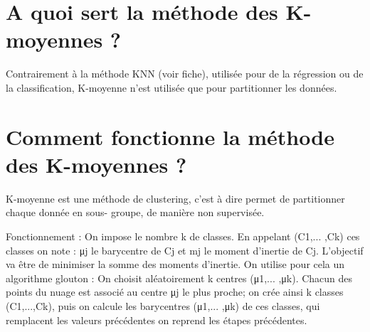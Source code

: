 \documentclass[a0,portrait]{a0poster}
\begin{document}




\color{SaddleBrown} %

\section*{A quoi sert la méthode des K-moyennes ?}

Contrairement à la méthode KNN (voir fiche), utilisée pour de la régression ou de la classification, K-moyenne n’est utilisée que pour partitionner les données.

\color{DarkSlateGray} %

\section*{Comment fonctionne la méthode des K-moyennes ?}

K-moyenne est une méthode de clustering, c’est à dire permet de partitionner chaque donnée en sous-
groupe, de manière non supervisée.

Fonctionnement :
On impose le nombre k de classes. En appelant (C1,... ,Ck) ces classes on note :
μj le barycentre de Cj et mj le moment d’inertie de Cj. 
L’objectif va être de minimiser la somme des moments d’inertie. On utilise pour cela un algorithme glouton :
On choisit aléatoirement k centres (μ1,... ,μk). Chacun des points du nuage est associé au centre μj le plus proche; on crée ainsi k classes (C1,...,Ck), puis on calcule les barycentres (μ1,... ,μk) de ces classes, qui remplacent les valeurs précédentes on reprend les étapes précédentes.
\end{document}
